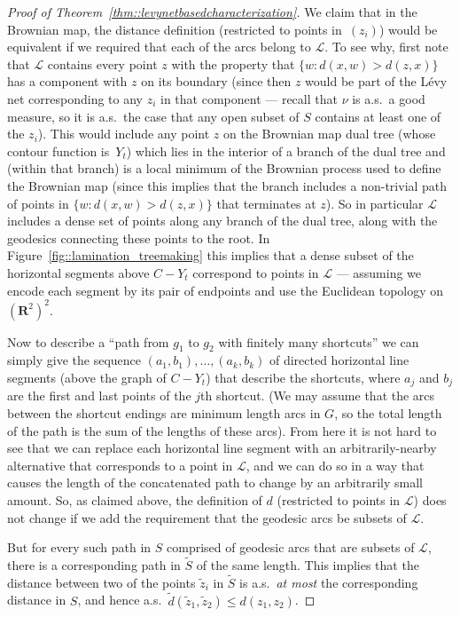 \documentclass[JEP,XML,SOM,Unicode]{cedram}
\let\mathcal\mathscr
\theoremstyle{plain}
\numberwithin{theorem}{section}
\theoremstyle{definition}
\newcommand{\R}{\mathbf{R}}
\let\wt\widetilde
\begin{document}
\begin{proof}[Proof of Theorem~\ref{thm::levynetbasedcharacterization}]
We claim that in the Brownian map, the distance definition (restricted to points in~$(z_i)$) would be equivalent if we required that each of the arcs belong to $\mathcal L$. To see why, first note that $\mathcal L$ contains every point $z$ with the property that $\{ w : d(x,w) > d(z,x)\}$ has a component with $z$ on its boundary (since then $z$ would be part of the Lévy net corresponding to any $z_i$ in that component --- recall that $\nu$ is a.s.\ a good measure, so it is a.s.\ the case that any open subset of $S$ contains at least one of the $z_i$). This would include any point $z$ on the Brownian map dual tree (whose contour function is~$Y_t$) which lies in the interior of a branch of the dual tree and (within that branch) is a local minimum of the Brownian process used to define the Brownian map (since this implies that the branch includes a non-trivial path of points in $\{ w : d(x,w) > d(z,x)\}$ that terminates at $z$). So in particular $\mathcal L$ includes a dense set of points along any branch of the dual tree, along with the geodesics connecting these points to the root. In Figure~\ref{fig::lamination_treemaking} this implies that a dense subset of the horizontal segments above $C-Y_t$ correspond to points in $\mathcal L$ --- assuming we encode each segment by its pair of endpoints and use the Euclidean topology on $(\R^2)^2$.

Now to describe a ``path from $g_1$ to $g_2$ with finitely many shortcuts'' we can simply give the sequence $(a_1,b_1), \ldots, (a_k,b_k)$ of directed horizontal line segments (above the graph of $C-Y_t$) that describe the shortcuts, where $a_j$ and $b_j$ are the first and last points of the $j$th shortcut. (We may assume that the arcs between the shortcut endings are minimum length arcs in $G$, so the total length of the path is the sum of the lengths of these arcs). From here it is not hard to see that we can replace each horizontal line segment with an arbitrarily-nearby alternative that corresponds to a point in $\mathcal L$, and we can do so in a way that causes the length of the concatenated path to change by an arbitrarily small amount. So, as claimed above, the definition of $d$ (restricted to points in $\mathcal L$) does not change if we add the requirement that the geodesic arcs be subsets of $\mathcal L$.

But for every such path in $S$ comprised of geodesic arcs that are subsets of $\mathcal L$, there is a corresponding path in $\wt{S}$ of the same length. This implies that the distance between two of the points $\wt{z}_i$ in $\wt{S}$ is a.s.\ \emph{at most} the corresponding distance in $S$, and hence a.s.\ $\wt{d}(\wt{z}_1,\wt{z}_2) \leq d(z_1,z_2)$.


\end{proof}
\end{document}

